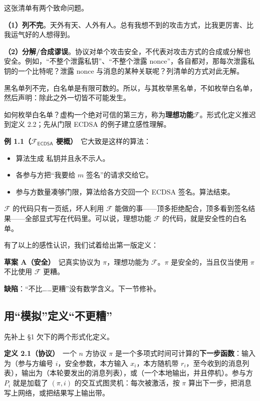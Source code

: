这张清单有两个致命问题。

\textbf{（1）列不完}。天外有天、人外有人。总有我想不到的攻击方式，比我更厉害、比我运气好的人想得到。

\textbf{（2）分解/合成谬误}。协议对单个攻击安全，不代表对攻击方式的合成或分解也安全。例如，“不整个泄露私钥”、“不整个泄露
nonce”，各自都对，那每次泄露私钥的一个比特呢？泄露 nonce
与消息的某种关联呢？列清单的方式对此无解。

黑名单列不完，白名单是有限可数的。所以，与其枚举黑名单，不如枚举白名单，然后声明：除此之外一切皆不可能发生。

如何枚举白名单？虚构一个绝对可信的第三方，称为\textbf{理想功能}$\mathcal{F}$。形式化定义推迟到定义
2.2；先从门限 ECDSA 的例子建立感性理解。

\textbf{例
1.1（$\mathcal{F}_{\mathsf{ECDSA}}$ 梗概）}　它大致是这样的算法：

\begin{itemize}

\item
  算法生成 私钥并且永不示人。
\item
  各参与方把“我要给 $m$ 签名”的请求交给它。
\item
  参与方数量凑够门限，算法给各方交回一个 ECDSA 签名。算法结束。
\end{itemize}

$\mathcal{F}$ 的代码只有一页纸，坏人利用 $\mathcal{F}$ 能做的事------顶多拒绝配合，顶多看到签名结果------全部显式写在代码里。可以说，理想功能 $\mathcal{F}$ 的代码，就是安全性的白名单。

有了以上的感性认识，我们试着给出第一版定义：

\textbf{草案
A（安全）}　记真实协议为 $\pi$，理想功能为 $\mathcal{F}$。$\pi$ 是安全的，当且仅当使用 $\pi$ 不比使用 $\mathcal{F}$ 更糟。

\textbf{缺陷}：“不比\ldots\ldots 更糟”没有数学含义。下一节修补。

\subsection{用“模拟”定义“不更糟”}

先补上 §1 欠下的两个形式化定义。

\textbf{定义
2.1（协议）}　一个 $n$ 方协议 $\pi$ 是一个多项式时间可计算的\textbf{下一步函数}：输入为（参与方编号 $i$，安全参数，本方输入 $x_i$，本方随机带 $r_i$，至今收到的消息列表），输出为（本轮要发出的消息列表），或（一个本地输出，并且停机）。参与方 $P_i$ 就是加载了 $(\pi, i)$ 的交互式图灵机：每次被激活，按 $\pi$ 算出下一步，把消息写上网络，或把结果写上输出带。

